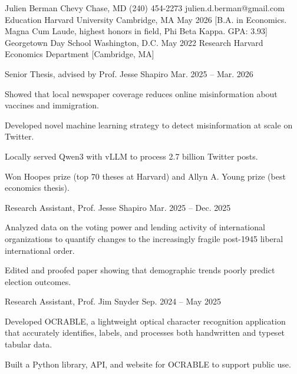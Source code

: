 \documentclass[11pt,a4paper]{article}
\begin{document}
\Header
    {Julien Berman}
    {Chevy Chase, MD}
    {(240) 454-2273}
    {julien.d.berman@gmail.com}
\SectionHeader
    {Education}
\EducationEntry
    {Harvard University}
    {Cambridge, MA}
    {May 2026}
    [B.A. in Economics. Magna Cum Laude, highest honors in field, Phi Beta Kappa. GPA: 3.93]
\EducationEntry
    {Georgetown Day School}
    {Washington, D.C.}
    {May 2022}
\SectionHeader
    {Research}
\Entry
    {Harvard Economics Department}
    [Cambridge, MA]
    {
        \Position
            {Senior Thesis, advised by Prof. Jesse Shapiro}
            {Mar. 2025 -- Mar. 2026}
            {
                \item Showed that local newspaper coverage reduces online misinformation about vaccines and immigration.
                \item Developed novel machine learning strategy to detect misinformation at scale on Twitter.
                \item Locally served Qwen3 with vLLM to process 2.7 billion Twitter posts.
                \item Won Hoopes prize (top $70$ theses at Harvard) and Allyn A. Young prize (best economics thesis).
            }
        \Position
            {Research Assistant, Prof. Jesse Shapiro}
            {Mar. 2025 -- Dec. 2025}
            {
                \item Analyzed data on the voting power and lending activity of international organizations to quantify changes to the increasingly fragile post-1945 liberal international order.
                \item Edited and proofed paper showing that demographic trends poorly predict election outcomes.
            }
        \Position
            {Research Assistant, Prof. Jim Snyder}
            {Sep. 2024 -- May 2025}
            {
                \item Developed OCRABLE, a lightweight optical character recognition application that accurately identifies, labels, and processes both handwritten and typeset tabular data.
                \item Built a Python library, API, and website for OCRABLE to support public use.
            }
    }
\end{document}
